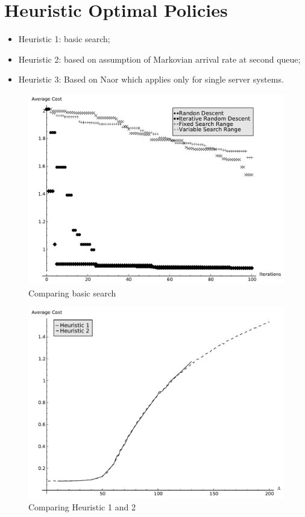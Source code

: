 \documentclass[12pt]{article}
\begin{document}
\section{Heuristic Optimal Policies}\label{heuristicoptimalpolicies}

\begin{itemize}
\item Heuristic 1: basic search;
\item Heuristic 2: based on assumption of Markovian arrival rate at second queue;
\item Heuristic 3: Based on Naor which applies only for single server systems.
\end{itemize}

\begin{figure}[!hbtp]
    \begin{center}
        \includegraphics[width=.8\textwidth]{Images/Solver_Comp.pdf}
    \end{center}
    \caption{Comparing basic search}\label{basicsearch}
\end{figure}

\begin{figure}[!hbtp]
    \begin{center}
        \includegraphics[width=.8\textwidth]{Images/CaseStudyComp.pdf}
    \end{center}
    \caption{Comparing Heuristic 1 and 2}\label{casestudycomp}
\end{figure}
\end{document}
